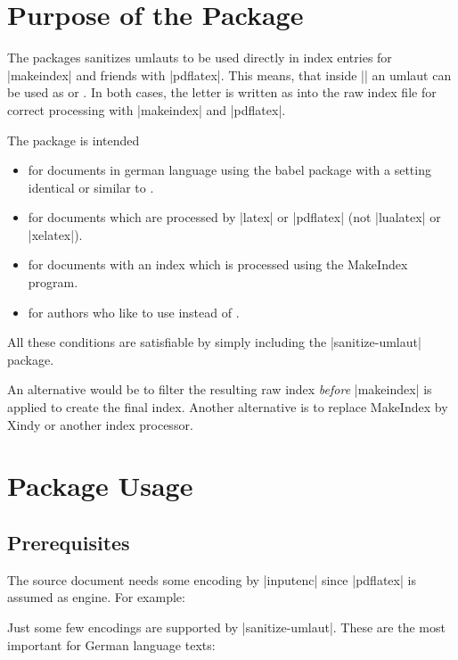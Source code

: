 \documentclass[a4paper,11pt]{ltxdoc}
\begin{document}
\clearpage
\section{Purpose of the Package}%
The packages sanitizes umlauts to be used directly in index entries for
|makeindex| and friends with |pdflatex|. This means, that inside |\index| an umlaut can
be used as  or . In both cases, the letter is written
as  into the raw index file for correct processing with |makeindex|
and |pdflatex|.

The package is intended
\begin{itemize}
\item for documents in german language using the babel package with a setting
  identical or similar to \myverb{\usepackage[ngerman]{babel}}.
\item for documents which are processed by |latex| or |pdflatex| (not |lualatex| or |xelatex|).
\item for documents with an index which is processed using the
  MakeIndex program.
\item for authors who like to use  instead of
  .
\end{itemize}

All these conditions are satisfiable by simply including the |sanitize-umlaut|
package.

An alternative would be to filter the resulting raw  index
\emph{before} |makeindex| is applied to create the final  index.
Another alternative is to replace MakeIndex by Xindy or another index
processor.


\section{Package Usage}%

\subsection{Prerequisites}
The source document needs some encoding by |inputenc| since |pdflatex|
is assumed as engine. For example:

\begin{dispListing}
\usepackage[utf8]{inputenc}
\end{dispListing}

Just some few encodings are supported by |sanitize-umlaut|.
These are the most important for German language texts:
\end{document}
